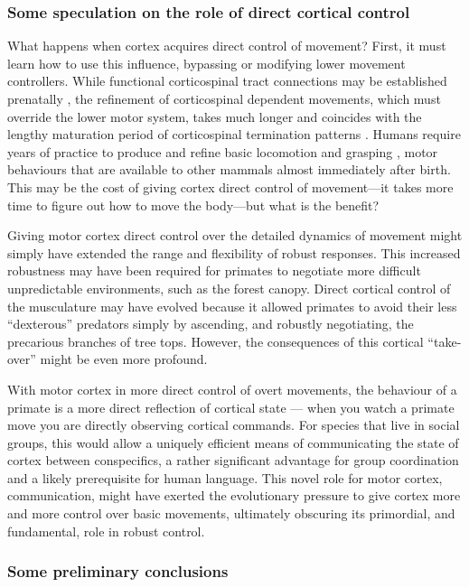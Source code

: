 \subsubsection*{Some speculation on the role of direct cortical control}

What happens when cortex acquires direct control of movement? First, it must learn how to use this influence, bypassing or modifying lower movement controllers. While functional corticospinal tract connections may be established prenatally \cite{Eyre2000}, the refinement of corticospinal dependent movements, which must override the lower motor system, takes much longer and coincides with the lengthy maturation period of corticospinal termination patterns \cite{Lawrence1976}. Humans require years of practice to produce and refine basic locomotion and grasping \cite{Thelen1985,VonHofsten1989}, motor behaviours that are available to other mammals almost immediately after birth. This may be the cost of giving cortex direct control of movement---it takes more time to figure out how to move the body---but what is the benefit?

Giving motor cortex direct control over the detailed dynamics of movement might simply have extended the range and flexibility of robust responses. This increased robustness may have been required for primates to negotiate more difficult unpredictable environments, such as the forest canopy. Direct cortical control of the musculature may have evolved because it allowed primates to avoid their less ``dexterous'' predators simply by ascending, and robustly negotiating, the precarious branches of tree tops. However, the consequences of this cortical ``take-over'' might be even more profound.

With motor cortex in more direct control of overt movements, the behaviour of a primate is a more direct reflection of cortical state --- when you watch a primate move you are directly observing cortical commands. For species that live in social groups, this would allow a uniquely efficient means of communicating the state of cortex between conspecifics, a rather significant advantage for group coordination and a likely prerequisite for human language. This novel role for motor cortex, communication, might have exerted the evolutionary pressure to give cortex more and more control over basic movements, ultimately obscuring its primordial, and fundamental, role in robust control.

\subsubsection*{Some preliminary conclusions}


